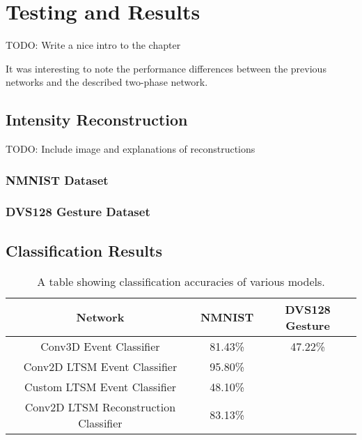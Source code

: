 \chapter{Testing and Results} \label{chap:testing_and_results}

\color{red} TODO: Write a nice intro to the chapter \color{black}

It was interesting to note the performance differences between the previous networks and the described two-phase network.

\section{Intensity Reconstruction}

\color{red} TODO: Include image and explanations of reconstructions \color{black}

\subsection{NMNIST Dataset}

\subsection{DVS128 Gesture Dataset}

\section{Classification Results}

\begin{table}[htb]
    \centering
    \begin{tabular}{|| c | c | c ||}
        \hline
        Network     & NMNIST & DVS128 Gesture \\
        \hline \hline
        Conv3D Event Classifier          & 81.43\%   &   \color{red} 47.22\% \color{black}    \\
        \hline
        Conv2D LTSM Event Classifier         & 95.80\%   &        \\
        \hline
        Custom LTSM Event Classifier         & \color{red} 48.10\% \color{black}   &        \\
        \hline
        Conv2D LTSM Reconstruction Classifier           & \color{red} 83.13\% \color{black}    &       \\
        \hline
    \end{tabular}
    \caption{A table showing classification accuracies of various models.}
    \label{tab:network_performances}
\end{table}